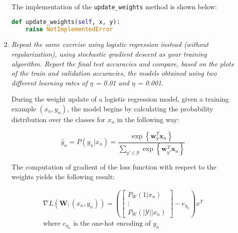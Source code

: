\documentclass[12pt]{article}
\begin{document}
\begin{enumerate}[leftmargin=\labelsep]
\begin{enumerate}[label=\alph*)]
                    The implementation of the \texttt{update\_weights} method is shown below:

                    \begin{lstlisting}[language=Python]
def update_weights(self, x, y):
    raise NotImplementedError\end{lstlisting}

                    \vspace{12pt}

              \item \textit{Repeat the same exercise using logistic regression instead (without regularization), using stochastic gradient descent as your training algorithm.  Report the final test accuracies and compare, based on the plots of the train and validation accuracies, the models obtained using two different learning rates of $\eta$ = 0.01 and $\eta$ = 0.001.}

                    \vspace{12pt}

                    During the weight update of a logistic regression model, given a training example $(x_n, y_n)$, the model begins by calculating the probability distribution over the classes for $x_n$ in the following way:

                    \begin{equation}
                        \hat{y}_n = P(y_n | x_n) = \frac{\exp \left\{ \mathbf{w}_y^T \mathbf{x}_n \right\}}{\sum\limits_{y' \in \mathcal{Y}} \exp \left\{ \mathbf{w}_{y'}^T \mathbf{x}_n \right\}}
                    \end{equation}

                    \vspace{12pt}

                    The computation of gradient of the loss function with respect to the weights yields the following result:

                    \begin{equation}
                        \begin{gathered}
                            \nabla L(\mathbf{W}; (x_n, y_n)) = \left(\begin{bmatrix}
                                P_W(1 | x_n) \\
                                \vdots       \\
                                P_W(|\mathcal{Y}| | x_n)
                            \end{bmatrix} - e_{y_n} \right) x^T \\
                            \text{where } e_{y_n} \text{ is the one-hot encoding of } y_n
                        \end{gathered}
                    \end{equation}


\end{enumerate}
\end{enumerate}
\end{document}
